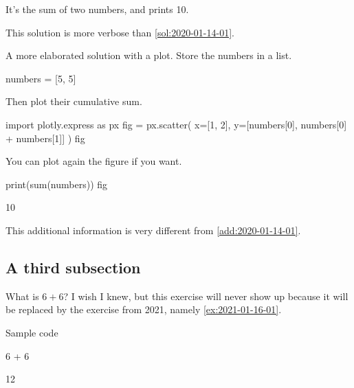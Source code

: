 \documentclass[oneside]{book}
\begin{document}
\begin{solution}
It's the sum of two numbers, and prints 10.

This solution is more verbose than \cref{sol:2020-01-14-01}.
\end{solution}

\begin{additionalinformation}
A more elaborated solution with a plot. Store the numbers in a list.

\begin{pycell}
numbers = [5, 5]
\end{pycell}

Then plot their cumulative sum.

\begin{pycell}
import plotly.express as px
fig = px.scatter(
    x=[1, 2],
    y=[numbers[0], numbers[0] + numbers[1]]
)
fig
\end{pycell}

You can plot again the figure if you want.

\begin{pycell}
print(sum(numbers))
fig
\end{pycell}
\begin{pyexpectedoutput}
10
\end{pyexpectedoutput}

This additional information is very different from \cref{add:2020-01-14-01}.
\end{additionalinformation}

\subsection{A third subsection}

\begin{exercise}[examdate={January 16, 2020}, examproblemnumber={1}, examproblemid={2020-01-16-01}, replacedbyexamproblemid={2021-01-16-01}, replacementsinceacademicyear={2025/2026}]
  What is \(6 + 6\)? I wish I knew, but this exercise will never show up because it will be replaced by the exercise from 2021, namely \cref{ex:2021-01-16-01}.

Sample code
\begin{pycell}
6 + 6
\end{pycell}
\begin{pyexpectedoutput}
12
\end{pyexpectedoutput}
\end{exercise}
\end{document}

